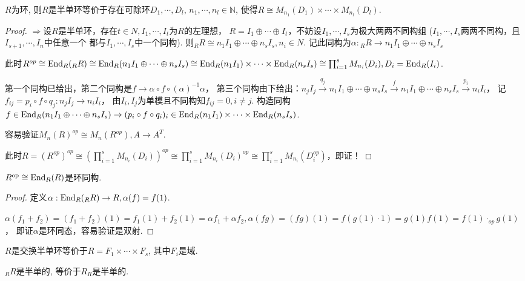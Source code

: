 \begin{proposition}
    $R$为环, 则$R$是半单环等价于存在可除环$D_1,\cdots,D_l$, $n_1,\cdots,n_l\in \mathbb{N}$, 使得$R\cong M_{n_1}(D_1)\times\cdots\times M_{n_l}(D_l)$.
\end{proposition}
\begin{proof}
$\Longrightarrow$设$R$是半单环，存在$t\in N,I_1,\cdots ,I_t$为$R$的左理想，
$R=I_1\oplus \cdots\oplus I_t$，不妨设$I_1,\cdots ,I_s$为极大两两不同构组
($I_1,\cdots, I_s$两两不同构，且$I_{s+1},\cdots ,I_n$中任意一个
都与$I_1,\cdots ,I_s$中一个同构).
则$_RR\cong n_1I_1\oplus \cdots\oplus n_sI_s,n_i\in N$.
记此同构为$\alpha:{}_RR\rightarrow n_1I_1\oplus \cdots\oplus n_sI_s$

此时$R^{op}\cong \operatorname{End}_R(_RR)\cong \operatorname{End}_R(n_1I_1\oplus \cdots\oplus n_sI_s)
\cong \operatorname{End}_R(n_1I_1)\times\cdots \times \operatorname{End}_R(n_sI_s)
\cong  \prod_{i=1}^{s} M_{n_i}(D_i),D_i=\operatorname{End}_R(I_i)$.

第一个同构已给出，第二个同构是$f\rightarrow \alpha\circ f\circ (\alpha)^{-1}\alpha$，
第三个同构由下给出：$n_jI_j\xrightarrow{q_j} n_1I_1\oplus \cdots\oplus n_sI_s\xrightarrow{f} n_1I_1\oplus \cdots\oplus n_sI_s\xrightarrow{p_i}n_iI_i$，
记$f_{ij}=p_i\circ f\circ q_j:n_jI_j\rightarrow n_iI_i$，
由$I_i,I_j$为单模且不同构知$f_{ij}=0,i\neq j$.
构造同构$f\in \operatorname{End}_R(n_1I_1\oplus \cdots\oplus n_sI_s) \rightarrow 
(p_i\circ f\circ q_i)_i\in \operatorname{End}_R(n_1I_1)\times\cdots \times \operatorname{End}_R(n_sI_s)$.


容易验证$M_n(R)^{op}\cong M_n(R^{op}),A\rightarrow A^{T}$.

此时$R=(R^{op})^{op}\cong (\prod_{i=1}^{s} M_{n_i}(D_i))^{op}\cong \prod_{i=1}^{s} M_{n_i}(D_i)^{op}\cong \prod_{i=1}^{s} M_{n_i}(D_i^{op}) $，即证！
\end{proof} 
\begin{proposition}
    $R^{\mathrm{op}}\cong \operatorname{End}_R(R)$是环同构.
\end{proposition}
\begin{proof}
定义$\alpha:\operatorname{End}_R(_RR)\rightarrow R,\alpha(f)=f(1)$.
	
$\alpha (f_1+f_2)=(f_1+f_2)(1)=f_1(1)+f_2(1)=\alpha f_1+\alpha f_2,
\alpha(fg)=(fg)(1)=f(g(1)\cdot1)=g(1)f(1)=f(1)\cdot_{op}g(1)$，
即证$\alpha$是环同态，容易验证是双射.
\end{proof}
\begin{corollary}
    $R$是交换半单环等价于$R=F_1\times \cdots\times F_s$, 其中$F_i$是域.
\end{corollary}

\begin{corollary}
    $_RR$是半单的, 等价于$R_R$是半单的.
\end{corollary}


